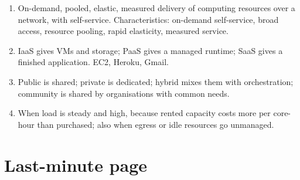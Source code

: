 \documentclass[11pt,a4paper]{article}
\begin{document}
\begin{enumerate}
\item On-demand, pooled, elastic, measured delivery of computing resources over a network, with self-service. Characteristics: on-demand self-service, broad access, resource pooling, rapid elasticity, measured service.
\item IaaS gives VMs and storage; PaaS gives a managed runtime; SaaS gives a finished application. EC2, Heroku, Gmail.
\item Public is shared; private is dedicated; hybrid mixes them with orchestration; community is shared by organisations with common needs.
\item When load is steady and high, because rented capacity costs more per core-hour than purchased; also when egress or idle resources go unmanaged.
\end{enumerate}

\section{Last-minute page}
\end{document}
